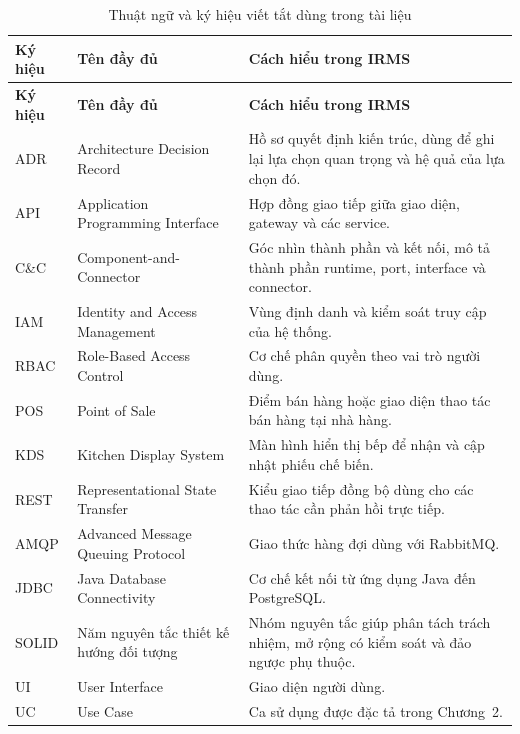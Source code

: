 {\small
\setlength{\LTleft}{0pt}
\setlength{\LTright}{0pt}
\setlength{\tabcolsep}{3pt}
\renewcommand{\arraystretch}{1.12}
\begin{longtable}{@{}>{\raggedright\arraybackslash}p{2.55cm} >{\raggedright\arraybackslash}p{3.95cm} >{\raggedright\arraybackslash}p{6.35cm}@{}}
\caption{Thuật ngữ và ký hiệu viết tắt dùng trong tài liệu}\label{tab:appendix-abbreviations}\\
\toprule
\textbf{Ký hiệu} & \textbf{Tên đầy đủ} & \textbf{Cách hiểu trong IRMS} \\
\midrule
\endfirsthead
\toprule
\textbf{Ký hiệu} & \textbf{Tên đầy đủ} & \textbf{Cách hiểu trong IRMS} \\
\midrule
\endhead
ADR & Architecture Decision Record & Hồ sơ quyết định kiến trúc, dùng để ghi lại lựa chọn quan trọng và hệ quả của lựa chọn đó. \\
API & Application Programming Interface & Hợp đồng giao tiếp giữa giao diện, gateway và các service. \\
C\&C & Component-and-Connector & Góc nhìn thành phần và kết nối, mô tả thành phần runtime, port, interface và connector. \\
IAM & Identity and Access Management & Vùng định danh và kiểm soát truy cập của hệ thống. \\
RBAC & Role-Based Access Control & Cơ chế phân quyền theo vai trò người dùng. \\
POS & Point of Sale & Điểm bán hàng hoặc giao diện thao tác bán hàng tại nhà hàng. \\
KDS & Kitchen Display System & Màn hình hiển thị bếp để nhận và cập nhật phiếu chế biến. \\
REST & Representational State Transfer & Kiểu giao tiếp đồng bộ dùng cho các thao tác cần phản hồi trực tiếp. \\
AMQP & Advanced Message Queuing Protocol & Giao thức hàng đợi dùng với \textsf{RabbitMQ}. \\
JDBC & Java Database Connectivity & Cơ chế kết nối từ ứng dụng Java đến \textsf{PostgreSQL}. \\
SOLID & Năm nguyên tắc thiết kế hướng đối tượng & Nhóm nguyên tắc giúp phân tách trách nhiệm, mở rộng có kiểm soát và đảo ngược phụ thuộc. \\
UI & User Interface & Giao diện người dùng. \\
UC & Use Case & Ca sử dụng được đặc tả trong Chương~2. \\
\bottomrule
\end{longtable}
\normalsize
}

